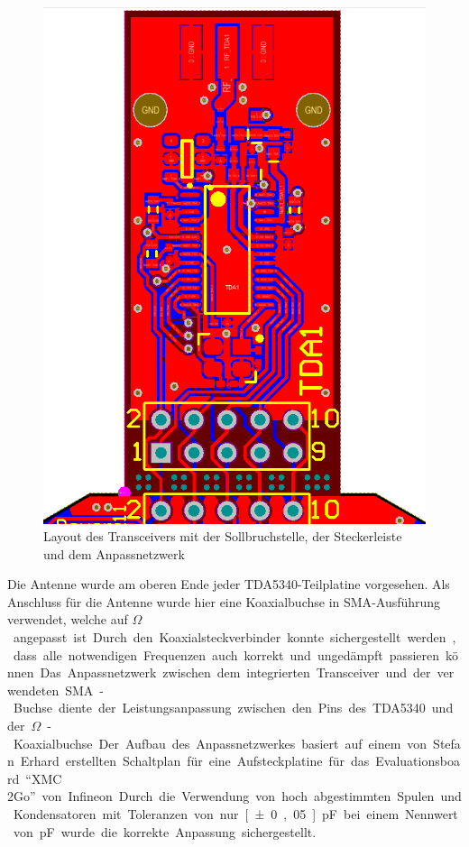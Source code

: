 \begin{figure}[h]
\centering
\includegraphics[trim=4.3cm 0cm 4.4cm 0cm, clip=true, totalheight=0.5\textheight,angle=-90]{Abbildungen/Aufnahmen/Bilder/Altium/TDA}
\caption{Layout des Transceivers mit der Sollbruchstelle, der Steckerleiste und dem Anpassnetzwerk}
\label{fig:tdalayout}
\end{figure}

 
Die Antenne wurde am oberen Ende jeder TDA5340-Teilplatine vorgesehen. Als Anschluss für die Antenne wurde hier eine Koaxialbuchse in \ac{SMA}-Ausführung verwendet, welche auf \unit[50]{$\Omega$} angepasst ist. Durch den Koaxialsteckverbinder konnte sichergestellt werden, dass alle notwendigen Frequenzen auch korrekt und ungedämpft passieren können. 
Das Anpassnetzwerk zwischen dem  integrierten Transceiver und der verwendeten \ac{SMA}-Buchse diente der Leistungsanpassung zwischen den Pins des TDA5340 und der \unit[50]{$\Omega$}-Koaxialbuchse. Der Aufbau des Anpassnetzwerkes basiert auf einem von Stefan Erhard erstellten Schaltplan für eine Aufsteckplatine für das Evaluationsboard \enquote{XMC 2Go} von Infineon. Durch die Verwendung von hoch abgestimmten Spulen und Kondensatoren mit Toleranzen von nur \unit[±0,05]{pF} bei einem Nennwert von \unit[2,5]{pF} wurde die korrekte Anpassung sichergestellt. 
 


